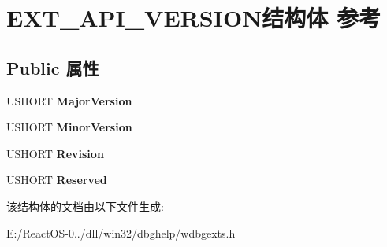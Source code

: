 \hypertarget{struct_e_x_t___a_p_i___v_e_r_s_i_o_n}{}\section{E\+X\+T\+\_\+\+A\+P\+I\+\_\+\+V\+E\+R\+S\+I\+O\+N结构体 参考}
\label{struct_e_x_t___a_p_i___v_e_r_s_i_o_n}
\subsection*{Public 属性}
\begin{DoxyCompactItemize}
\item 
\mbox{\label{struct_e_x_t___a_p_i___v_e_r_s_i_o_n_a274a61d3de66e1962527b58fb61cfd36}} 
U\+S\+H\+O\+RT {\bfseries Major\+Version}
\item 
\mbox{\label{struct_e_x_t___a_p_i___v_e_r_s_i_o_n_ae7d59ffd530a8248acae4e5c6765e3a4}} 
U\+S\+H\+O\+RT {\bfseries Minor\+Version}
\item 
\mbox{\label{struct_e_x_t___a_p_i___v_e_r_s_i_o_n_a69473ad1f86ea2ce7d404a1962f97e8c}} 
U\+S\+H\+O\+RT {\bfseries Revision}
\item 
\mbox{\label{struct_e_x_t___a_p_i___v_e_r_s_i_o_n_a7c149fab9aff8a83d5f51348b378a9c7}} 
U\+S\+H\+O\+RT {\bfseries Reserved}
\end{DoxyCompactItemize}


该结构体的文档由以下文件生成\+:\begin{DoxyCompactItemize}
\item 
E\+:/\+React\+O\+S-\/0../dll/win32/dbghelp/wdbgexts.\+h\end{DoxyCompactItemize}
